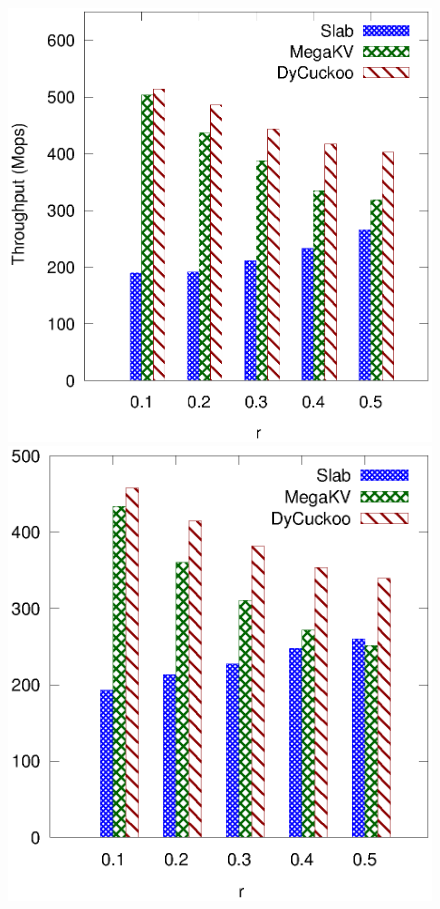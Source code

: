 \begin{figure}[htp]
	\begin{minipage}{0.19\linewidth}\centering
		\includegraphics[width=\linewidth]{pic/dynamic/r/dynamic_twitter.eps}
		\centerline{\dstwitter}
	\end{minipage}
	\begin{minipage}{0.19\linewidth}\centering
		\includegraphics[width=\linewidth]{pic/dynamic/r/dynamic_reddit.eps}

\end{minipage}
\end{figure}
